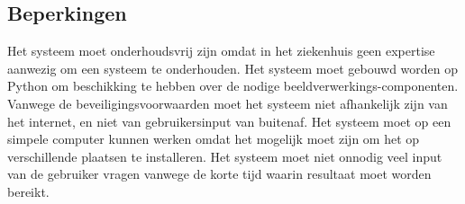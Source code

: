 \subsection{Beperkingen}
Het systeem moet onderhoudsvrij zijn omdat in het ziekenhuis geen expertise aanwezig om een systeem te onderhouden.
Het systeem moet gebouwd worden op Python om beschikking te hebben over de nodige beeldverwerkings-componenten.
Vanwege de beveiligingsvoorwaarden moet het systeem niet afhankelijk zijn van het internet, en niet van gebruikersinput van buitenaf.
Het systeem moet op een simpele computer kunnen werken omdat het mogelijk moet zijn om het op verschillende plaatsen te installeren.
Het systeem moet niet onnodig veel input van de gebruiker vragen vanwege de korte tijd waarin resultaat moet worden bereikt.